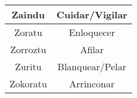 \documentclass[11pt, a4paper]{article}
\begin{document}
\begin{table}[h]
\begin{tabular}{cc}
		                         Zaindu                          &                         Cuidar/Vigilar                         \\ \hline
		                         Zoratu                          &                           Enloquecer                           \\ \hline
		                        Zorroztu                         &                             Afilar                             \\ \hline
		                         Zuritu                          &                        Blanquear/Pelar                         \\ \hline
		                        Zokoratu                         &                           Arrinconar                           \\ \hline
	\end{tabular}
\end{table}
\end{document}
